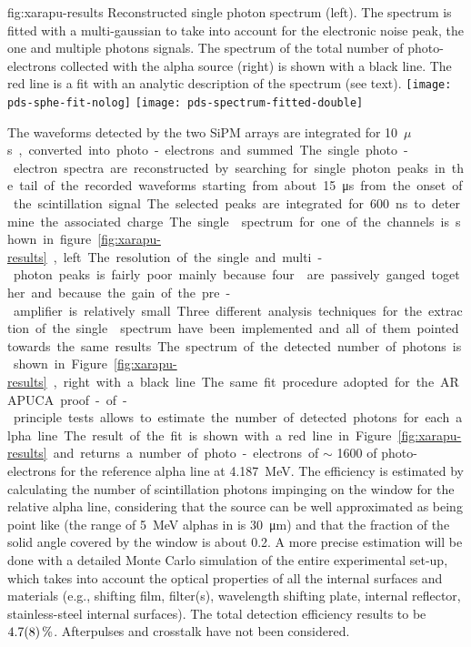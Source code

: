 \begin{dunefigure}{fig:xarapu-results}
{Reconstructed single photon spectrum (left). The spectrum is fitted with a multi-gaussian to take into account for the electronic noise peak, the one and multiple photons signals. The  spectrum of the total number of photo-electrons collected with the alpha source (right) is shown with a black line. The red line is a fit with an analytic description of the spectrum (see text).} 
	\texttt{[image: pds-sphe-fit-nolog]} \quad
	\texttt{[image: pds-spectrum-fitted-double]}
\end{dunefigure}  


The waveforms detected by the two SiPM arrays are integrated for \SI{10}{$\mu$s}, converted into photo-electrons and summed. 
The single photo-electron spectra are reconstructed by searching for single photon peaks in  the tail of the recorded waveforms starting from about \SI{15}{\micro\second} from the onset of the scintillation signal. The selected peaks are integrated for \SI{600}{ns} to determine the associated charge. The single \phel spectrum for one of the channels is shown in figure \ref{fig:xarapu-results}, left. The resolution of the single and multi-photon peaks is fairly poor mainly because  four  are passively ganged together and because the gain of the pre-amplifier is relatively small. Three different analysis techniques for the extraction of the single \phel spectrum have been implemented and all of them pointed towards the same results.

The spectrum of the detected number of photons is shown in Figure~\ref{fig:xarapu-results}, right with a black line. The same fit procedure adopted for the ARAPUCA proof-of-principle tests allows to estimate the number of detected photons for each alpha line. The result of the fit is shown with a red line in Figure~\ref{fig:xarapu-results} and returns a number of photo-electrons of $\sim$ 1600 of photo-electrons for the reference alpha line at \SI{4.187}{MeV}. The efficiency is estimated by calculating the number of scintillation photons impinging on the  window for the relative alpha line, considering that the source can be well approximated as being point like (the range of \SI{5}{MeV} alphas in \lar is \SI{30}{\micro\meter}) and that the fraction of the solid angle covered by the  window is about 0.2. A more precise estimation  will be done with  a detailed Monte Carlo simulation of the entire experimental set-up, which takes into account the optical properties of all the internal surfaces and materials (e.g., shifting film, filter(s), wavelength shifting plate, internal reflector, stainless-steel internal surfaces).  The total detection efficiency results to be $\SI{4.7\pm0.8}{\%}$. Afterpulses and crosstalk have not been considered.



